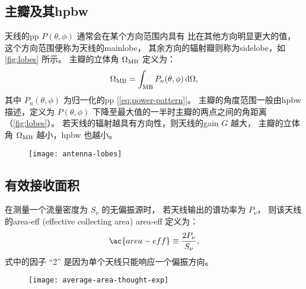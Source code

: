 \subsection{主瓣及其\acl*{hpbw}}

天线的\ac{pp} $P(\theta,\phi)$ 通常会在某个方向范围内具有
比在其他方向明显更大的值，
这个方向范围便称为天线的\acf{mainlobe}，
其余方向的辐射瓣则称为\acf{sidelobe}，如\autoref{fig:lobes} 所示。
主瓣的立体角 $\Omega_{\mathrm{MB}}$ 定义为：
\begin{equation}
  \label{eq:omega-mb}
  \Omega_{\mathrm{MB}} = \int_{\mathrm{MB}} P_n(\theta,\phi) \,\mathrm{d}\Omega ,
\end{equation}
其中 $P_n(\theta,\phi)$ 为归一化的\ac{pp} [\autoref{eq:power-pattern}]。
主瓣的角度范围一般由\acf{hpbw}描述，定义为 $P(\theta,\phi)$
下降至最大值的一半时主瓣的两点之间的角距离（\autoref{fig:lobes}）。
若天线的辐射越具有方向性，则天线的\ac{gain} $G$ 越大，
主瓣的立体角 $\Omega_{\mathrm{MB}}$ 越小，\ac{hpbw} 也越小。

\begin{figure}[htp]
  \centering
  \texttt{[image: antenna-lobes]}
  \label{fig:lobes}
\end{figure}

\subsection{有效接收面积}

在测量一个流量密度为 $S_{\nu}$ 的无偏振源时，
若天线输出的谱功率为 $P_{\nu}$，
则该天线的\acl{area-eff} (effective collecting area) \ac{area-eff}
定义为：
\begin{equation}
  \label{eq:area-eff}
  \ac{area-eff} \equiv \frac{2 P_{\nu}}{S_{\nu}} ,
\end{equation}
式中的因子 \enquote{2} 是因为单个天线只能响应一个偏振方向。

\begin{figure}[htp]
  \centering
  \texttt{[image: average-area-thought-exp]}
  \label{fig:area-avg-exp}
\end{figure}

